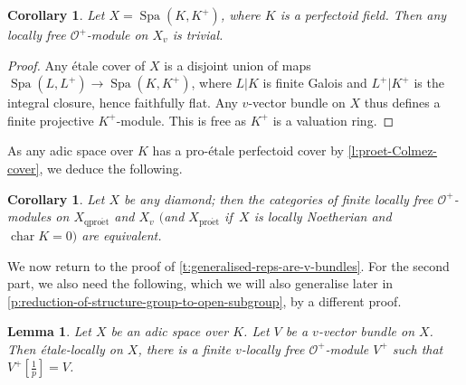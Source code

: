 \documentclass[11pt]{amsart}
\numberwithin{equation}{section}
\newtheorem{Lemma}[thm]{Lemma}
\newtheorem{Corollary}[thm]{Corollary}
\theoremstyle{definition}
\theoremstyle{remark}
\renewcommand{\O}{\mathcal{O}}
\newcommand{\Spa}{\operatorname{Spa}}
\newcommand{\proet}{{\operatorname{pro\acute{e}t}}}
\newcommand{\qproet}{{\operatorname{qpro\acute{e}t}}}
\newcommand{\tf}{[\tfrac{1}{p}]}
\begin{document}
\begin{Corollary}\label{c:v-vb-on-Spa(K)}
	Let $X=\Spa(K,K^+)$, where $K$ is a perfectoid field. Then any locally free $\O^+$-module on $X_v$ is trivial.
\end{Corollary}

\begin{proof} 
	Any \'etale cover of $X$ is a disjoint union of maps $\Spa(L,L^+)\to \Spa(K,K^+)$, where $L|K$ is finite Galois and $L^+|K^+$ is the integral closure, hence faithfully flat. Any $v$-vector bundle on $X$ thus defines a finite projective $K^+$-module. This is free as $K^+$ is a valuation ring.
\end{proof}

As any adic space over $K$ has a pro-\'etale perfectoid cover by \cref{l:proet-Colmez-cover}, we deduce the following. 

\begin{Corollary}\label{c:vector-bundles-on-diamonds-different-tops}
	Let $X$ be any diamond; then the categories of finite locally free $\O^+$-modules on $X_{\qproet}$ and  $X_{v}$ $($and $X_{\proet}$ if\, $X$ is locally Noetherian and $\operatorname{char} K=0)$ are equivalent. 
\end{Corollary}

We now return to the proof of \cref{t:generalised-reps-are-v-bundles}. For the second part, we also need the following, which we will also generalise later in \cref{p:reduction-of-structure-group-to-open-subgroup}, by a different proof. 

\begin{Lemma}\label{l:v-bundle-is-et-locally-small}
	Let $X$ be an adic space over $K$. Let $V$ be a $v$-vector bundle on $X$. Then \'etale-locally on $X$, there is a finite $v$-locally  free $\O^+$-module $V^+$ such that $V^+\tf=V$.
\end{Lemma}
\end{document}
